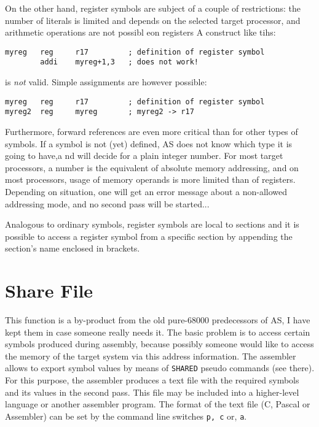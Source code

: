 \documentclass[12pt,twoside]{report}
\makeatletter
\newcommand{\tty}[1]{{\tt #1}}
\newcommand{\ttindex}[1]{\index{#1@{\tt #1}}}
\makeatother
\begin{document}
On the other hand, register symbols are subject of a couple of restrictions: the
number of literals is limited and depends on the selected target processor, and
arithmetic operations are not possibl eon registers A construct like tihs:
\begin{verbatim}
myreg   reg     r17         ; definition of register symbol
        addi    myreg+1,3   ; does not work!
\end{verbatim}
is {\em not} valid.  Simple assignments are however possible:
\begin{verbatim}
myreg   reg     r17         ; definition of register symbol
myreg2  reg     myreg       ; myreg2 -> r17
\end{verbatim}
Furthermore, forward references are even more critical than for other
types of symbols.  If a symbol is not (yet) defined, AS does not know
which type it is going to have,a nd will decide for a plain integer number.
For most target processors, a number is the equivalent of absolute
memory addressing, and on most processors, usage of memory operands
is more limited than of registers.  Depending on situation, one will
get an error message about a non-allowed addressing mode, and no second
pass will be started...

Analogous to ordinary symbols, register symbols are local to sections and
it is possible to access a register symbol from a specific section by
appending the section's name enclosed in brackets.


\section{Share File}
\label{ChapShareMain}
\ttindex{SHARED}

This function is a by-product from the old pure-68000 predecessors of
AS, I have kept them in case someone really needs it.  The basic
problem is to access certain symbols produced during assembly,
because possibly someone would like to access the memory of the
target system via this address information.  The assembler allows to
export symbol values by means of \tty{SHARED} pseudo commands (see there).
For this purpose, the assembler produces a text file with the required
symbols and its values in the second pass.  This file may be included
into a higher-level language or another assembler program.  The
format of the text file (C, Pascal or Assembler) can be set by the
command line switches \tty{p, c} or, \tty{a}.
\end{document}
